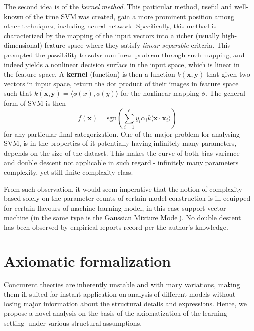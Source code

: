 \documentclass[10pt]{article} %
\begin{document}
The second idea is of the \textit{kernel method}. This particular method, useful and well-known of the time SVM was created, gain a more prominent position among other techniques, including neural network. Specifically, this method is characterized by the mapping of the input vectors into a richer (usually high-dimensional) feature space where they satisfy \textit{linear separable} criteria. This prompted the possibility to solve nonlinear problem through such mapping, and indeed yields a nonlinear decision surface in the input space, which is linear in the feature space. A \textbf{kernel} (function) is then a function $k(\mathbf{x},\mathbf{y})$ that given two vectors in input space, return the dot product of their images in feature space such that $k(\mathbf{x},\mathbf{y})=\langle \phi(x), \phi(y) \rangle$ for the nonlinear mapping $\phi$. The general form of SVM is then 
\begin{equation}
    f(\mathbf{x}) = \mathrm{sgn} \left(\sum^{\ell}_{i=1} y_{i}\alpha_{i}k\langle \mathbf{x}\cdot \mathbf{x}_{i} \rangle\right)
\end{equation}
for any particular final categorization. One of the major problem for analysing SVM, is in the properties of it potentially having infinitely many parameters, depends on the size of the dataset. This makes the curve of both bias-variance and double descent not applicable in such regard - infinitely many parameters complexity, yet still finite complexity class. 

From such observation, it would seem imperative that the notion of complexity based solely on the parameter counts of certain model construction is ill-equipped for certain flavours of machine learning model, in this case support vector machine (in the same type is the Gaussian Mixture Model). No double descent has been observed by empirical reports record per the author's knowledge. 



\clearpage

\section{Axiomatic formalization}

Concurrent theories are inherently unstable and with many variations, making them ill-suited for instant application on analysis of different models without losing major information about the structural details and expressions. Hence, we propose a novel analysis on the basis of the axiomatization of the learning setting, under various structural assumptions. 
\end{document}
